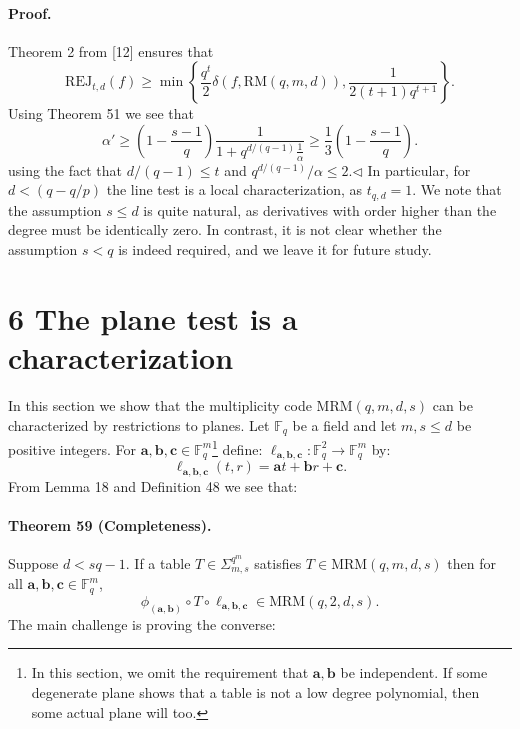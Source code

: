 \documentclass[10pt,a4paper]{article}
\begin{document}
\paragraph{Proof.} Theorem 2 from [12] ensures that
\[\mathrm{REJ}_{t,d}(f)\geq\min\left\{\frac{q^t}2\delta(f,\mathrm{RM}(q,m,d)),\frac1{2(t+1)q^{t+1}}\right\}.\]
Using Theorem 51 we see that
\[\alpha'\geq\left(1-\frac{s-1}q\right)\frac1{1+q^{d/(q-1)}\frac1\alpha}\geq\frac13\left(1-\frac{s-1}q\right).\]
using the fact that $d/(q-1)\leq t$ and $q^{d/(q-1)}/\alpha\leq2$.\hfill$\triangleleft$
In particular, for $d<(q-q/p)$ the line test is a local characterization, as $t_{q,d}=1$.
We note that the assumption $s\leq d$ is quite natural, as derivatives with order higher than the degree must be identically zero. In contrast, it is not clear whether the assumption $s<q$ is indeed required, and we leave it for future study.

\section*{6 The plane test is a characterization}
In this section we show that the multiplicity code $\mathrm{MRM}(q,m,d,s)$ can be characterized by restrictions to planes. Let $\mathbb F_q$ be a field and let $m,s\leq d$ be positive integers. For $\boldsymbol a,\boldsymbol b,\boldsymbol c\in\mathbb F_q^m$\footnote{In this section, we omit the requirement that $\boldsymbol a,\boldsymbol b$ be independent. If some degenerate plane shows that a table is not a low degree polynomial, then some actual plane will too.} define: $\ell_{\boldsymbol a,\boldsymbol b,\boldsymbol c}:\mathbb F_q^2\to\mathbb F_q^m$ by:
\[\ell_{\boldsymbol a,\boldsymbol b,\boldsymbol c}(t,r)=\boldsymbol at+\boldsymbol br+\boldsymbol c.\]
From Lemma 18 and Definition 48 we see that:
\paragraph{Theorem 59 (Completeness).} Suppose $d<sq-1$. If a table $T\in\Sigma_{m,s}^{q^m}$ satisfies $T\in\mathrm{MRM}(q,m,d,s)$ then for all $\boldsymbol a,\boldsymbol b,\boldsymbol c\in\mathbb F_q^m$,
\[\phi_{(\boldsymbol a,\boldsymbol b)}\circ T\circ\ell_{\boldsymbol a,\boldsymbol b,\boldsymbol c}\in\mathrm{MRM}(q,2,d,s).\]
The main challenge is proving the converse:
\end{document}
